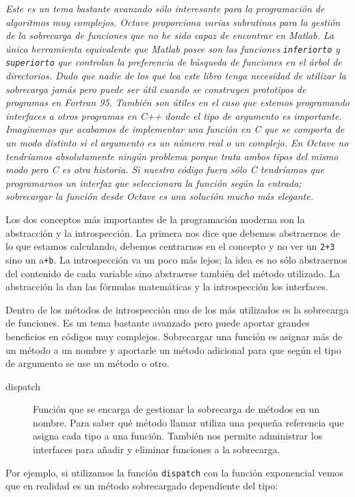 \emph{Este es un tema bastante avanzado sólo interesante para la
  programación de algoritmos muy complejos. Octave proporciona varias
  subrutinas para la gestión de la sobrecarga de funciones que no he
  sido capaz de encontrar en Matlab. La única herramienta equivalente
  que Matlab posee son las funciones} \texttt{\emph{inferiorto}}
\emph{y} \texttt{\emph{superiorto}} \emph{que controlan la preferencia
  de búsqueda de funciones en el árbol de directorios. Dudo que nadie
  de los que lea este libro tenga necesidad de utilizar la sobrecarga
  jamás pero puede ser útil cuando se construyen prototipos de
  programas en Fortran 95. También son útiles en el caso que estemos
  programando interfaces a otros programas en C++ donde el tipo de
  argumento es importante. Imaginemos que acabamos de implementar una
  función en C que se comporta de un modo distinto si el argumento es
  un número real o un complejo. En Octave no tendríamos absolutamente
  ningún problema porque trata ambos tipos del mismo modo pero C es
  otra historia. Si nuestro código fuera sólo C tendríamos que
  programarnos un interfaz que seleccionara la función según la
  entrada; sobrecargar la función desde Octave es una solución mucho
  más elegante.}

Los dos conceptos más importantes de la programación moderna son la
abstracción y la introspección. La primera nos dice que debemos
abstraernos de lo que estamos calculando, debemos centrarnos en el
concepto y no ver un \texttt{2+3} sino un a\texttt{+b}. La
introspección va un poco más lejos; la idea es no sólo abstraernos del
contenido de cada variable sino abstraerse también del método
utilizado. La abstracción la dan las fórmulas matemáticas y la
introspección los interfaces.

Dentro de los métodos de introspección uno de los más utilizados es la
sobrecarga de funciones. Es un tema bastante avanzado pero puede
aportar grandes beneficios en códigos muy complejos. Sobrecargar una
función es asignar más de un método a un nombre y aportarle un método
adicional para que según el tipo de argumento se use un método o otro.

\begin{description}
\item [dispatch]Función que se encarga de gestionar la
  sobrecarga de métodos en un nombre. Para saber qué método llamar
  utiliza una pequeña referencia que asigna cada tipo a una función.
  También nos permite administrar los interfaces para añadir y
  eliminar funciones a la sobrecarga.
\end{description}
Por ejemplo, si utilizamos la función \texttt{dispatch} con la función
exponencial vemos que en realidad es un método sobrecargado
dependiente del tipo:

